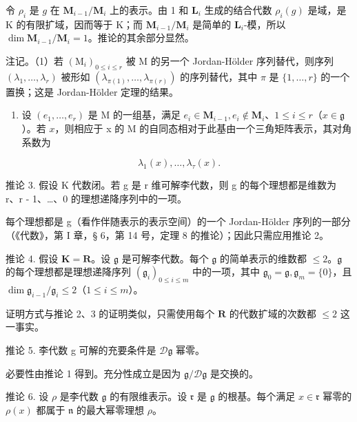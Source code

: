 令 \(\rho_{i}\) 是 \(g\) 在 \(\mathbf{M}_{i-1}/\mathbf{M}_{i}\) 上的表示。由 1 和 \(\mathbf{L}_{i}\) 生成的结合代数 \(\rho_{i}(g)\) 是域，是 K 的有限扩域，因而等于 K；而 \(\mathbf{M}_{i-1}/\mathbf{M}_{i}\) 是简单的 \(\mathbf{L}_{i}\)-模，所以 \(\dim \mathbf{M}_{i-1}/\mathbf{M}_{i} = 1\)。推论的其余部分显然。

注记。（1）若 \((\mathrm{M}_i)_{0\leqslant i\leqslant r}\) 被 M 的另一个 Jordan-Hölder 序列替代，则序列 \((\lambda_1,\dots ,\lambda_r)\) 被形如 \((\lambda_{\pi (1)},\dots ,\lambda_{\pi (r)})\) 的序列替代，其中 \(\pi\) 是 \(\{1,\dots ,r\}\) 的一个置换；这是 Jordan-Hölder 定理的结果。

\begin{enumerate}
\def\labelenumi{(\arabic{enumi})}
\setcounter{enumi}{1}
\tightlist
\item
  设 \((e_1, \ldots, e_r)\) 是 M 的一组基，满足 \(e_i \in \mathbf{M}_{i-1}, e_i \notin \mathbf{M}_i\)、\(1 \leqslant i \leqslant r\)（\(x \in \mathfrak{g}\)）。若 \(x\)，则相应于 x 的 M 的自同态相对于此基由一个三角矩阵表示，其对角系数为
\end{enumerate}

\[
\lambda_ {1} (x), \dots , \lambda_ {\tau} (x).
\]

推论 3. 假设 K 代数闭。若 g 是 r 维可解李代数，则 g 的每个理想都是维数为 r、r - 1、\ldots、0 的理想递降序列中的一项。

每个理想都是 g（看作伴随表示的表示空间）的一个 Jordan-Hölder 序列的一部分（《代数》，第 I 章，§ 6，第 14 号，定理 8 的推论）；因此只需应用推论 2。

推论 4. 假设 \(\mathbf{K} = \mathbf{R}\)。设 \(\mathfrak{g}\) 是可解李代数。每个 \(\mathfrak{g}\) 的简单表示的维数都 \(\leqslant 2\)。\(\mathfrak{g}\) 的每个理想都是理想递降序列 \((\mathfrak{g}_i)_{0\leqslant i\leqslant m}\) 中的一项，其中 \(\mathfrak{g}_0 = \mathfrak{g},\mathfrak{g}_m = \{0\}\)，且 \(\dim \mathfrak{g}_{i - 1} / \mathfrak{g}_i\leqslant 2\)（\(1\leqslant i\leqslant m\)）。

证明方式与推论 2、3 的证明类似，只需使用每个 \(\mathbf{R}\) 的代数扩域的次数都 \(\leqslant 2\) 这一事实。

推论 5. 李代数 g 可解的充要条件是 \(\mathcal{D}\mathfrak{g}\) 幂零。

必要性由推论 1 得到。充分性成立是因为 \(\mathfrak{g} / \mathcal{D}\mathfrak{g}\) 是交换的。

推论 6. 设 \(\rho\) 是李代数 \(\mathfrak{g}\) 的有限维表示。设 \(\mathfrak{r}\) 是 \(\mathfrak{g}\) 的根基。每个满足 \(x \in \mathfrak{r}\) 幂零的 \(\rho(x)\) 都属于 \(\mathfrak{n}\) 的最大幂零理想 \(\rho\)。

